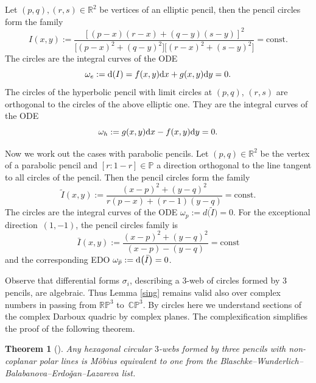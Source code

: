 \documentclass[pdftex]{sigma}
\numberwithin{equation}{section}
\newtheorem{Theorem}{Theorem}[section]
\begin{document}
 Let $(p,q),(r,s)\in \mathbb{R}^2$ be vertices of an elliptic pencil, then the pencil circles form the family
\[
I(x,y):=\frac{[(p-x)(r-x)+(q-y)(s-y)]^2}{\bigl[(p-x)^2+(q-y)^2\bigr]\bigl[(r-x)^2+(s-y)^2\bigr]}=\text{const}.
\]
The circles are the integral curves of the ODE
\[%
\omega_e:={\rm d}(I)=f(x,y){\rm d}x+g(x,y){\rm d}y=0.
\]
The circles of the hyperbolic pencil with limit circles at $(p,q)$, $(r,s)$ are orthogonal to the circles of the above elliptic one. They are the integral curves of the ODE
\[%
\omega_h:=g(x,y){\rm d}x-f(x,y){\rm d}y=0.
\]

Now we work out the cases with parabolic pencils. Let $(p,q)\in \mathbb{R}^2$ be the vertex of a parabolic pencil and $[r:1-r]\in \mathbb{P}$ a direction orthogonal to the line tangent to all circles of the pencil. Then the pencil circles form the family
\[
\tilde{I}(x,y):=\frac{(x-p)^2 + (y-q)^2}{r(p-x) + (r - 1)(y - q)}=\text{const}.
\]
The circles are the integral curves of the ODE
$
\omega_p:=d\bigl(\tilde{I}\bigr)=0$.
For the exceptional direction~${(1,-1)}$, the pencil circles family is
\[
\bar{I}(x,y):=\frac{(x-p)^2 + (y-q)^2}{(x-p) - (y - q)}=\text{const}
\]
and the corresponding EDO
$
\omega_{\bar{p}}:={\rm d}\bigl(\bar{I}\bigr)=0$.

Observe that differential forms $\sigma_i$, describing a 3-web of circles formed by 3 pencils, are algebraic. Thus Lemma \ref{sing} remains valid also over complex numbers in passing from $\mathbb{RP}^3$ to~$\mathbb{CP}^3$. By circles here we understand sections of the complex Darboux quadric by complex planes. The complexification simplifies the proof of the following theorem.


\begin{Theorem}[\cite{S-05}]\label{3pencils}
Any hexagonal circular $3$-webs formed by three pencils with non-coplanar polar lines is M\"obius equivalent to one from the Blaschke--Wunderlich--Balabanova--Erdo\v{g}an--Lazareva list.
\end{Theorem}
\end{document}
